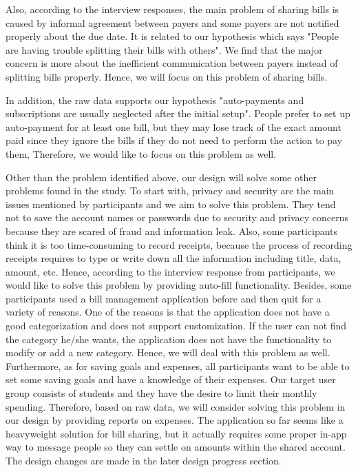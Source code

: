 \documentclass{sigchi}
\begin{document}
Also, according to the interview responses, the main problem of sharing bills is caused by informal agreement between payers and some payers are not notified properly about the due date. It is related to our hypothesis which says "People are having trouble splitting their bills with others". We find that the major concern is more about the inefficient communication between payers instead of splitting bills properly. Hence, we will focus on this problem of sharing bills.
 
In addition, the raw data supports our hypothesis "auto-payments and subscriptions are usually neglected after the initial setup". People prefer to set up auto-payment for at least one bill, but they may lose track of the exact amount paid since they ignore the bills if they do not need to perform the action to pay them, Therefore, we would like to focus on this problem as well.
 
Other than the problem identified above, our design will solve some other problems found in the study. To start with, privacy and security are the main issues mentioned by participants and we aim to solve this problem. They tend not to save the account names or passwords due to security and privacy concerns because they are scared of fraud and information leak. Also, some participants think it is too time-consuming to record receipts, because the process of recording receipts requires to type or write down all the information including title, data, amount, etc. Hence, according to the interview response from participants, we would like to solve this problem by providing auto-fill functionality. Besides, some participants used a bill management application before and then quit for a variety of reasons. One of the reasons is that the application does not have a good categorization and does not support customization. If the user can not find the category he/she wants, the application does not have the functionality to modify or add a new category. Hence, we will deal with this problem as well. Furthermore, as for saving goals and expenses, all participants want to be able to set some saving goals and have a knowledge of their expenses. Our target user group consists of students and they have the desire to limit their monthly spending. Therefore, based on raw data, we will consider solving this problem in our design by providing reports on expenses. The application so far seems like a heavyweight solution for bill sharing, but it actually requires some proper in-app way to message people so they can settle on amounts within the shared account. The design changes are made in the later design progress section. 
\end{document}
